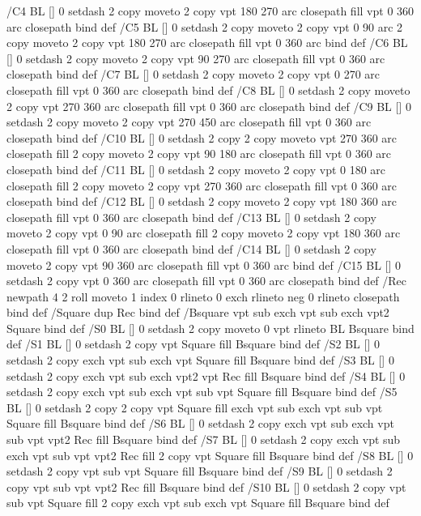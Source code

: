 /C4 {BL [] 0 setdash 2 copy moveto
	2 copy vpt 180 270 arc closepath fill
	vpt 0 360 arc closepath} bind def
/C5 {BL [] 0 setdash 2 copy moveto
	2 copy vpt 0 90 arc
	2 copy moveto
	2 copy vpt 180 270 arc closepath fill
	vpt 0 360 arc} bind def
/C6 {BL [] 0 setdash 2 copy moveto
	2 copy vpt 90 270 arc closepath fill
	vpt 0 360 arc closepath} bind def
/C7 {BL [] 0 setdash 2 copy moveto
	2 copy vpt 0 270 arc closepath fill
	vpt 0 360 arc closepath} bind def
/C8 {BL [] 0 setdash 2 copy moveto
	2 copy vpt 270 360 arc closepath fill
	vpt 0 360 arc closepath} bind def
/C9 {BL [] 0 setdash 2 copy moveto
	2 copy vpt 270 450 arc closepath fill
	vpt 0 360 arc closepath} bind def
/C10 {BL [] 0 setdash 2 copy 2 copy moveto vpt 270 360 arc closepath fill
	2 copy moveto
	2 copy vpt 90 180 arc closepath fill
	vpt 0 360 arc closepath} bind def
/C11 {BL [] 0 setdash 2 copy moveto
	2 copy vpt 0 180 arc closepath fill
	2 copy moveto
	2 copy vpt 270 360 arc closepath fill
	vpt 0 360 arc closepath} bind def
/C12 {BL [] 0 setdash 2 copy moveto
	2 copy vpt 180 360 arc closepath fill
	vpt 0 360 arc closepath} bind def
/C13 {BL [] 0 setdash 2 copy moveto
	2 copy vpt 0 90 arc closepath fill
	2 copy moveto
	2 copy vpt 180 360 arc closepath fill
	vpt 0 360 arc closepath} bind def
/C14 {BL [] 0 setdash 2 copy moveto
	2 copy vpt 90 360 arc closepath fill
	vpt 0 360 arc} bind def
/C15 {BL [] 0 setdash 2 copy vpt 0 360 arc closepath fill
	vpt 0 360 arc closepath} bind def
/Rec {newpath 4 2 roll moveto 1 index 0 rlineto 0 exch rlineto
	neg 0 rlineto closepath} bind def
/Square {dup Rec} bind def
/Bsquare {vpt sub exch vpt sub exch vpt2 Square} bind def
/S0 {BL [] 0 setdash 2 copy moveto 0 vpt rlineto BL Bsquare} bind def
/S1 {BL [] 0 setdash 2 copy vpt Square fill Bsquare} bind def
/S2 {BL [] 0 setdash 2 copy exch vpt sub exch vpt Square fill Bsquare} bind def
/S3 {BL [] 0 setdash 2 copy exch vpt sub exch vpt2 vpt Rec fill Bsquare} bind def
/S4 {BL [] 0 setdash 2 copy exch vpt sub exch vpt sub vpt Square fill Bsquare} bind def
/S5 {BL [] 0 setdash 2 copy 2 copy vpt Square fill
	exch vpt sub exch vpt sub vpt Square fill Bsquare} bind def
/S6 {BL [] 0 setdash 2 copy exch vpt sub exch vpt sub vpt vpt2 Rec fill Bsquare} bind def
/S7 {BL [] 0 setdash 2 copy exch vpt sub exch vpt sub vpt vpt2 Rec fill
	2 copy vpt Square fill Bsquare} bind def
/S8 {BL [] 0 setdash 2 copy vpt sub vpt Square fill Bsquare} bind def
/S9 {BL [] 0 setdash 2 copy vpt sub vpt vpt2 Rec fill Bsquare} bind def
/S10 {BL [] 0 setdash 2 copy vpt sub vpt Square fill 2 copy exch vpt sub exch vpt Square fill
	Bsquare} bind def
